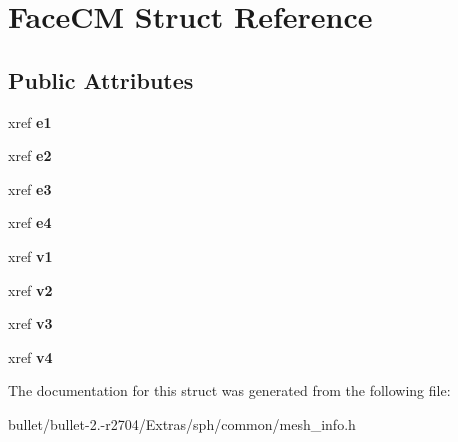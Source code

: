\hypertarget{struct_face_c_m}{\section{Face\+C\+M Struct Reference}
\label{struct_face_c_m}
}
\subsection*{Public Attributes}
\begin{DoxyCompactItemize}
\item 
\hypertarget{struct_face_c_m_ac01876962c910e02ce8804cdecf01d34}{xref {\bfseries e1}}\label{struct_face_c_m_ac01876962c910e02ce8804cdecf01d34}

\item 
\hypertarget{struct_face_c_m_a7fd64874146849357d60c90082250de2}{xref {\bfseries e2}}\label{struct_face_c_m_a7fd64874146849357d60c90082250de2}

\item 
\hypertarget{struct_face_c_m_a661e9263ca779b25efab2cda42a41bfa}{xref {\bfseries e3}}\label{struct_face_c_m_a661e9263ca779b25efab2cda42a41bfa}

\item 
\hypertarget{struct_face_c_m_a175e82338aa538f2bc5efc6bf74b5bf2}{xref {\bfseries e4}}\label{struct_face_c_m_a175e82338aa538f2bc5efc6bf74b5bf2}

\item 
\hypertarget{struct_face_c_m_a73152beb80fda33a2d37e6039df0bf0a}{xref {\bfseries v1}}\label{struct_face_c_m_a73152beb80fda33a2d37e6039df0bf0a}

\item 
\hypertarget{struct_face_c_m_a807229415f7a883abf0d688d81dbcf9c}{xref {\bfseries v2}}\label{struct_face_c_m_a807229415f7a883abf0d688d81dbcf9c}

\item 
\hypertarget{struct_face_c_m_af037934fdb2d3c6955a9b02bd2920ead}{xref {\bfseries v3}}\label{struct_face_c_m_af037934fdb2d3c6955a9b02bd2920ead}

\item 
\hypertarget{struct_face_c_m_ae14d9ae32df3825acdf1e689a4a2f4e4}{xref {\bfseries v4}}\label{struct_face_c_m_ae14d9ae32df3825acdf1e689a4a2f4e4}

\end{DoxyCompactItemize}


The documentation for this struct was generated from the following file\+:\begin{DoxyCompactItemize}
\item 
bullet/bullet-\/2.-\/r2704/\+Extras/sph/common/mesh\+\_\+info.\+h\end{DoxyCompactItemize}
